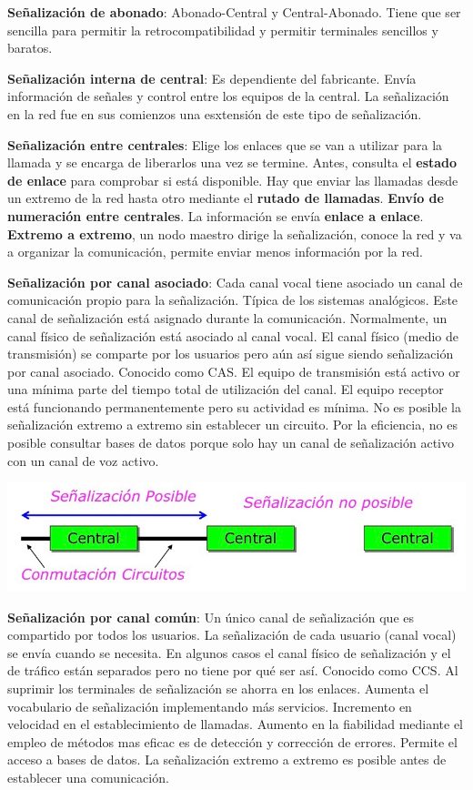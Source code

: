 \documentclass[10pt,portrait, twocolumn]{article}
\begin{document}
\textbf{Señalización de abonado}: Abonado-Central y Central-Abonado. Tiene que ser sencilla para permitir la retrocompatibilidad y permitir terminales sencillos y baratos.

\textbf{Señalización interna de central}: Es dependiente del fabricante. Envía información de señales y control entre los equipos de la central. La señalización en la red fue en sus comienzos una esxtensión de este tipo de señalización.

\textbf{Señalización entre centrales}: Elige los enlaces que se van a utilizar para la llamada y se encarga de liberarlos una vez se termine. Antes, consulta el \textbf{estado de enlace} para comprobar si está disponible. Hay que enviar las llamadas desde un extremo de la red hasta otro mediante el \textbf{rutado de llamadas}. \textbf{Envío de numeración entre centrales}. La información se envía \textbf{enlace a enlace}. \textbf{Extremo a extremo}, un nodo maestro dirige la señalización, conoce la red y va a organizar la comunicación, permite enviar menos información por la red.

\textbf{Señalización por canal asociado}: Cada canal vocal tiene asociado un canal de comunicación propio para la señalización. Típica de los sistemas analógicos. Este canal de señalización está asignado durante la comunicación. Normalmente, un canal físico de señalización está asociado al canal vocal. El canal físico (medio de transmisión) se comparte por los usuarios pero aún así sigue siendo señalización por canal asociado. Conocido como CAS. El equipo de transmisión está activo or una mínima parte del tiempo total de utilización del canal. El equipo receptor está funcionando permanentemente pero su actividad es mínima. No es posible la señalización extremo a extremo sin establecer un circuito. Por la eficiencia, no es posible consultar bases de datos porque solo hay un canal de señalización activo con un canal de voz activo.

	\begin{center}
		\includegraphics[scale = 0.2]{SenalizacionAsociado}
	\end{center}

\textbf{Señalización por canal común}: Un único canal de señalización que es compartido por todos los usuarios. La señalización de cada usuario (canal vocal) se envía cuando se necesita. En algunos casos el canal físico de señalización y el de tráfico están separados pero no tiene por qué ser así. Conocido como CCS. Al suprimir los terminales de señalización se ahorra en los enlaces. Aumenta el vocabulario de señalización implementando más servicios. Incremento en velocidad en el establecimiento de llamadas. Aumento en la fiabilidad mediante el empleo de métodos mas eficac es de detección y corrección de errores. Permite el acceso a bases de datos. La señalización extremo a extremo es posible antes de establecer una comunicación.
\end{document}
